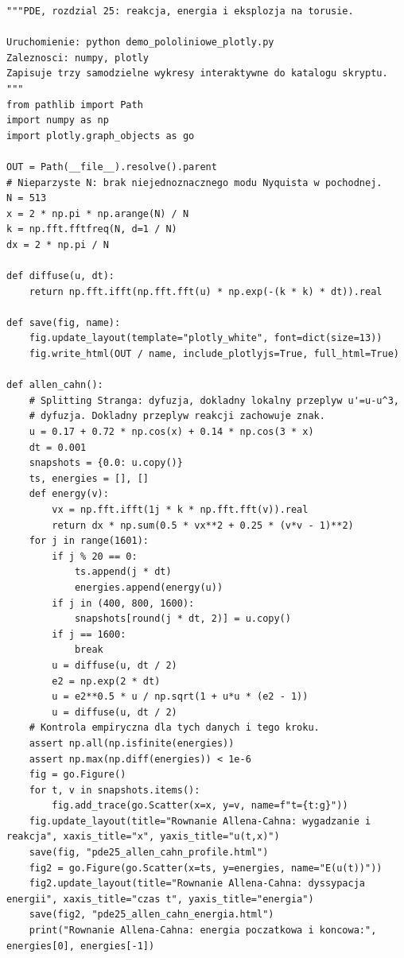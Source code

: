\begin{lstlisting}[style=pythonpde,caption={Równania półliniowe: energia i eksplozja (Plotly)},label={code:pde25-plotly}]
"""PDE, rozdzial 25: reakcja, energia i eksplozja na torusie.

Uruchomienie: python demo_pololiniowe_plotly.py
Zaleznosci: numpy, plotly
Zapisuje trzy samodzielne wykresy interaktywne do katalogu skryptu.
"""
from pathlib import Path
import numpy as np
import plotly.graph_objects as go

OUT = Path(__file__).resolve().parent
# Nieparzyste N: brak niejednoznacznego modu Nyquista w pochodnej.
N = 513
x = 2 * np.pi * np.arange(N) / N
k = np.fft.fftfreq(N, d=1 / N)
dx = 2 * np.pi / N

def diffuse(u, dt):
    return np.fft.ifft(np.fft.fft(u) * np.exp(-(k * k) * dt)).real

def save(fig, name):
    fig.update_layout(template="plotly_white", font=dict(size=13))
    fig.write_html(OUT / name, include_plotlyjs=True, full_html=True)

def allen_cahn():
    # Splitting Stranga: dyfuzja, dokladny lokalny przeplyw u'=u-u^3,
    # dyfuzja. Dokladny przeplyw reakcji zachowuje znak.
    u = 0.17 + 0.72 * np.cos(x) + 0.14 * np.cos(3 * x)
    dt = 0.001
    snapshots = {0.0: u.copy()}
    ts, energies = [], []
    def energy(v):
        vx = np.fft.ifft(1j * k * np.fft.fft(v)).real
        return dx * np.sum(0.5 * vx**2 + 0.25 * (v*v - 1)**2)
    for j in range(1601):
        if j % 20 == 0:
            ts.append(j * dt)
            energies.append(energy(u))
        if j in (400, 800, 1600):
            snapshots[round(j * dt, 2)] = u.copy()
        if j == 1600:
            break
        u = diffuse(u, dt / 2)
        e2 = np.exp(2 * dt)
        u = e2**0.5 * u / np.sqrt(1 + u*u * (e2 - 1))
        u = diffuse(u, dt / 2)
    # Kontrola empiryczna dla tych danych i tego kroku.
    assert np.all(np.isfinite(energies))
    assert np.max(np.diff(energies)) < 1e-6
    fig = go.Figure()
    for t, v in snapshots.items():
        fig.add_trace(go.Scatter(x=x, y=v, name=f"t={t:g}"))
    fig.update_layout(title="Rownanie Allena-Cahna: wygadzanie i reakcja", xaxis_title="x", yaxis_title="u(t,x)")
    save(fig, "pde25_allen_cahn_profile.html")
    fig2 = go.Figure(go.Scatter(x=ts, y=energies, name="E(u(t))"))
    fig2.update_layout(title="Rownanie Allena-Cahna: dyssypacja energii", xaxis_title="czas t", yaxis_title="energia")
    save(fig2, "pde25_allen_cahn_energia.html")
    print("Rownanie Allena-Cahna: energia poczatkowa i koncowa:", energies[0], energies[-1])


\end{lstlisting}
